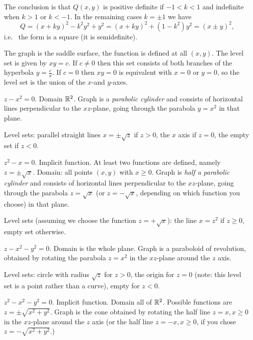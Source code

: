 The conclusion is that $Q(x,y)$ is positive definite if $-1<k<1$ and indefinite when
$k>1$ or $k<-1$.  In the remaining cases $k=\pm1$ we have
\[
  Q=(x+ky)^2 - k^2 y^2 + y^2
   =(x+ky)^2 + (1- k^2) y^2 = (x\pm y)^2,
\]
i.e.~ the form is a square (it is semidefinite).
\bigskip

\item[{\bfseries(III5.7a)}]

The graph is the saddle surface, the function is defined at all $(x,y)$.  The level
set is given by $xy = c$.  If $c\ne 0$ then this set consists of both branches of the
hyperbola $y=\frac{c}{x}$.  If $c=0$ then $xy=0$ is equivalent with $x=0$ or $y=0$,
so the level set is the union of the $x$-and $y$-axes.
\bigskip

\item[{\bfseries(III5.7b)}]

$z-x^2=0$.
Domain $\mathbb{R}^2$.  Graph is a \emph{parabolic cylinder} and consists of
horizontal lines perpendicular to the $xz$-plane, going through the
parabola $y=x^2$ in that plane.

Level sets: parallel straight lines $x=\pm\sqrt{z}$ if $z>0$,
the $x$ axis if $z=0$, the empty set if $z<0$.
\bigskip

\item[{\bfseries(III5.7c)}]

$z^2-x=0$.
Implicit function.
At least two functions are defined, namely $z=\pm \sqrt{x}$.
Domain: all points $(x,y)$ with $x\ge 0$.
Graph is \emph{half a parabolic cylinder} and consists of
horizontal lines perpendicular to the $xz$-plane, going through the
parabola $z=\sqrt x$ (or $z=-\sqrt x$, depending on which function
you choose) in that plane.

Level sets (assuming we choose the function $z=+\sqrt{x}$):
the line $x=z^2$ if $z\ge0$, empty set otherwise.
\bigskip

\item[{\bfseries(III5.7d)}]

$z-x^2-y^2=0$.
Domain is the whole plane.
Graph is a paraboloid of revolution, obtained by rotating the
parabola $z=x^2$ in the $xz$-plane around the $z$ axis.

Level sets: circle with radius $\sqrt{z}$ for $z>0$,
the origin for $z=0$ (note: this level set is a point rather than a curve),
empty for $z<0$.
\bigskip

\item[{\bfseries(III5.7e)}]

$z^2-x^2-y^2=0$.
Implicit function.  Domain all of $\mathbb{R}^2$.
Possible functions are $z=\pm\sqrt{x^2+y^2}$.
Graph is the cone obtained by rotating the
half line $z=x, x\geq0$ in the $xz$-plane around the $z$ axis
(or the half line $z=-x, x\geq0$, if you chose $z=-\sqrt{x^2+y^2}$.)

